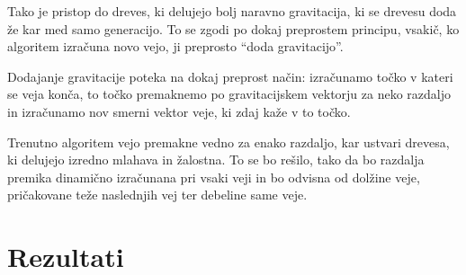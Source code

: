 \documentclass[10pt,a4paper,oneside]{book}
\begin{document}
Tako je pristop do dreves, ki delujejo bolj naravno gravitacija, ki se
drevesu doda že kar med samo generacijo. To se zgodi po dokaj
preprostem principu, vsakič, ko algoritem izračuna novo vejo, ji
preprosto ``doda gravitacijo''.

Dodajanje gravitacije poteka na dokaj preprost način: izračunamo točko
v kateri se veja konča, to točko premaknemo po gravitacijskem vektorju
za neko razdaljo in izračunamo nov smerni vektor veje, ki zdaj kaže v
to točko.

Trenutno algoritem vejo premakne vedno za enako razdaljo, kar ustvari
drevesa, ki delujejo izredno mlahava in žalostna. To se bo rešilo,
tako da bo razdalja premika dinamično izračunana pri vsaki veji in bo
odvisna od dolžine veje, pričakovane teže naslednjih vej ter debeline
same veje.

\chapter{Rezultati}
\end{document}
